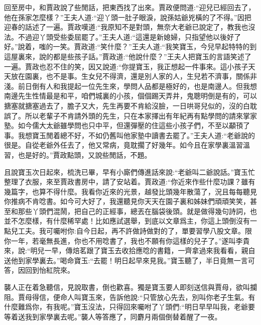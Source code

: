 \begin{parag}
\end{parag}


\begin{parag}
    回至房中，和賈政說了些閒話，把東西找了出來。賈政便問道:“迎兒已經回去了，他在孫家怎麼樣？”王夫人道:“迎丫頭一肚子眼淚，說孫姑爺兇橫的了不得。”因把迎春的話述了一遍。賈政嘆道:“我原知不是對頭，無奈大老爺已說定了，教我也沒法。不過迎丫頭受些委屈罷了。”王夫人道:“這還是新媳婦，只指望他以後好了好。”說着，嗤的一笑。賈政道:“笑什麼？”王夫人道:“我笑寶玉，今兒早起特特的到這屋裏來，說的都是些孩子話。”賈政道:“他說什麼？”王夫人把寶玉的言語笑述了一遍。賈政也忍不住的笑，因又說道:“你提寶玉，我正想起一件事來。這小孩子天天放在園裏，也不是事。生女兒不得濟，還是別人家的人，生兒若不濟事，關係非淺。前日倒有人和我提起一位先生來，學問人品都是極好的，也是南邊人。但我想南邊先生性情最是和平，咱們城裏的小孩，個個踢天弄井，鬼聰明倒是有的，可以搪塞就搪塞過去了，膽子又大，先生再要不肯給沒臉，一日哄哥兒似的，沒的白耽誤了。所以老輩子不肯請外頭的先生，只在本家擇出有年紀再有點學問的請來掌家塾。如今儒大太爺雖學問也只中平，但還彈壓的住這些小孩子們，不至以顢頇了事。我想寶玉閒着總不好，不如仍舊叫他家塾中讀書去罷了。”王夫人道:“老爺說的很是。自從老爺外任去了，他又常病，竟耽擱了好幾年。如今且在家學裏溫習溫習，也是好的。”賈政點頭，又說些閒話，不題。
\end{parag}


\begin{parag}
    且說寶玉次日起來，梳洗已畢，早有小廝們傳進話來說:“老爺叫二爺說話。”寶玉忙整理了衣服，來至賈政書房中，請了安站着。賈政道:“你近來作些什麼功課？雖有幾篇字，也算不得什麼。我看你近來的光景，越發比頭幾年散蕩了，況且每每聽見你推病不肯唸書。如今可大好了，我還聽見你天天在園子裏和姊妹們頑頑笑笑，甚至和那些丫頭們混鬧，把自己的正經事，總丟在腦袋後頭。就是做得幾句詩詞，也並不怎麼樣，有什麼稀罕處！比如應試選舉，到底以文章爲主，你這上頭倒沒有一點兒工夫。我可囑咐你:自今日起，再不許做詩做對的了，單要習學八股文章。限你一年，若毫無長進，你也不用唸書了，我也不願有你這樣的兒子了。”遂叫李貴來，說:“明兒一早，傳焙茗跟了寶玉去收拾應唸的書籍，一齊拿過來我看看，親自送他到家學裏去。”喝命寶玉:“去罷！明日起早來見我。”寶玉聽了，半日竟無一言可答，因回到怡紅院來。
\end{parag}


\begin{parag}
    襲人正在着急聽信，見說取書，倒也歡喜。獨是寶玉要人即刻送信與賈母，欲叫攔阻。賈母得信，便命人叫寶玉來，告訴他說:“只管放心先去，別叫你老子生氣。有什麼難爲你，有我呢。”寶玉沒法，只得回來囑咐了丫頭們:“明日早早叫我，老爺要等着送我到家學裏去呢。”襲人等答應了，同麝月兩個倒替着醒了一夜。
\end{parag}


